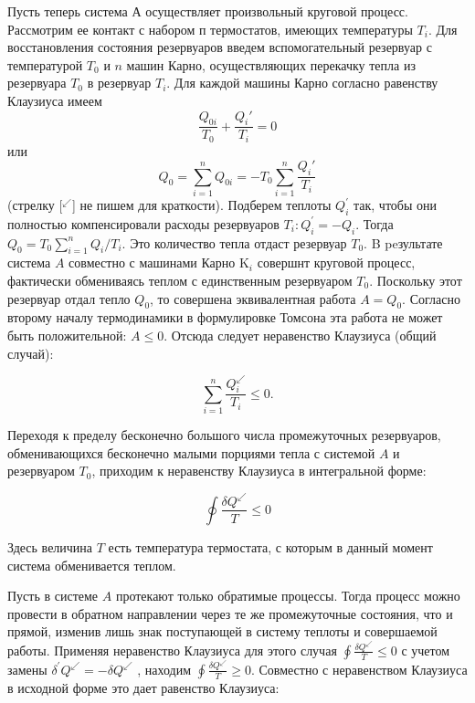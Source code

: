 \documentclass[a4paper,14pt]{article} %
\begin{document}
Пусть теперь система А осуществляет произвольный круговой процесс. Рассмотрим ее контакт с набором $п$ термостатов, имеющих температуры $T_i$. Для восстановления состояния резервуаров введем вспомогательный резервуар с температурой $T_0$ и $n$ машин Карно, осуществляющих перекачку тепла из резервуара $T_0$ в резервуар $T_i$. Для каждой машины Карно согласно равенству Клаузиуса имеем
\[\frac{Q_{0i}}{T_0} + \frac{Q_i'}{T_i} = 0\]
или
\[Q_0 = \sum\limits_{i = 1}^n Q_{0i} = -T_0\sum\limits_{i=1}^n \frac {Q_i'}{T_i}\]
(стрелку [$^{\swarrow}$] не пишем для краткости). Подберем теплоты $Q_{i}^{\prime}$ так, чтобы они полностью компенсировали расходы резервуаров $T_{i}: Q_{i}^{\prime}=-Q_{i} .$ Тогда $Q_{0}=T_{0} \sum_{i=1}^{n} Q_{i} / T_{i} .$ Это количество тепла отдаст резервуар $T_{0} .$ B peзультате система $A$ совместно с машинами Карно $\mathrm{K}_{i}$ совершнт круговой процесс, фактически обмениваясь теплом с единственным резервуаром $T_{0}$. Поскольку этот резервуар отдал тепло $Q_{0}$, то совершена эквивалентная работа $A=Q_{0} .$ Согласно второму началу термодинамики в формулировке Томсона эта работа не может быть положительной: $A \leqslant 0 .$ Отсюда следует неравенство Клаузиуса (общий случай):

\begin{equation*}
\sum_{i=1}^{n} \frac{Q_{i}^{\swarrow}}{T_{i}} \leqslant 0.
\end{equation*}

Переходя к пределу бесконечно большого числа промежуточных резервуаров, обменивающихся бесконечно малыми порциями тепла с системой $A$ и резервуаром $T_0$, приходим к неравенству Клаузиуса в интегральной форме:

\begin{equation*}
\oint \frac{\delta Q^{\swarrow}}{T} \leqslant 0
\end{equation*}

Здесь величина $T$ есть температура термостата, с которым в данный
момент система обменивается теплом.

Пусть в системе $A$ протекают только обратимые процессы. Тогда процесс можно провести в обратном направлении через те же промежуточные состояния, что и прямой, изменив лишь знак поступающей в систему теплоты и совершаемой работы. Применяя неравенство Клаузиуса
для этого случая $\oint \frac{\delta Q^{\swarrow}}{T} \leqslant 0$ с учетом замены $\delta^{\prime} Q^{\swarrow}= - \delta Q^{\swarrow}$ , находим $\oint \frac{\delta Q^{\swarrow}}{T} \geqslant 0$. Совместно с неравенством Клаузиуса в исходной форме это
дает равенство Клаузиуса:
\end{document}
